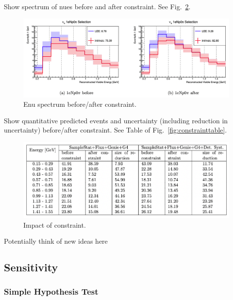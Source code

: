 \documentclass{article}
\begin{document}
Show spectrum of nues before and after constraint. See Fig.~\ref{fig:constraint}.

\begin{center}
\begin{figure}[h]
    \includegraphics[width=1.00\textwidth]{technote/images/constraint.png}
    \caption{\label{fig:constraint} Enu spectrum before/after constraint.}
\end{figure}
\end{center}

Show quantitative predicted events and uncertainty (including reduction in uncertainty) before/after constraint. See Table of Fig.~\ref{fig:constrainttable}.

\begin{center}
\begin{figure}
    \includegraphics[width=1.00\textwidth]{technote/images/constrainttable.png}
    \caption{\label{fig:constraint} Impact of constraint.}
\end{figure}
\end{center}

Potentially think of new ideas here

\newpage
\subsection{Sensitivity}
\label{sec:sensitivity}

\subsubsection{Simple Hypothesis Test}
\end{document}
